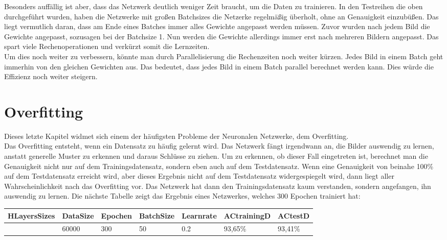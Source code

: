 \documentclass[12pt]{article}
\begin{document}
Besonders auffällig ist aber, dass das Netzwerk deutlich weniger Zeit braucht, um die Daten zu trainieren. In den Testreihen die oben durchgeführt wurden, haben die Netzwerke mit großen Batchsizes die Netzerke regelmäßig überholt, ohne an Genauigkeit einzubüßen.
Das liegt vermutlich daran, dass am Ende eines Batches immer alles Gewichte angepasst werden müssen. Zuvor wurden nach jedem Bild die Gewichte angepasst, sozusagen bei der Batchsize 1. Nun werden die Gewichte allerdings immer erst nach mehreren Bildern angepasst. Das spart viele Rechenoperationen und verkürzt somit die Lernzeiten. \\
Um dies noch weiter zu verbessern, könnte man durch Parallelisierung die Rechenzeiten noch weiter kürzen. Jedes Bild in einem Batch geht immerhin von den gleichen Gewichten aus. Das bedeutet, dass jedes Bild in einem Batch parallel berechnet werden kann. Dies würde die Effizienz noch weiter steigern.

\section{Overfitting}
Dieses letzte Kapitel widmet sich einem der häufigsten Probleme der Neuronalen Netzwerke, dem Overfitting. \\
Das Overfitting entsteht, wenn ein Datensatz zu häufig gelernt wird. Das Netzwerk fängt irgendwann an, die Bilder auswendig zu lernen, anstatt generelle Muster zu erkennen und daraus Schlüsse zu ziehen. 
Um zu erkennen, ob dieser Fall eingetreten ist, berechnet man die Genauigkeit nicht nur auf dem Trainingsdatensatz, sondern eben auch auf dem Testdatensatz. Wenn eine Genauigkeit von beinahe 100\% auf dem Testdatensatz erreicht wird, aber dieses Ergebnis nicht auf dem Testdatensatz widergespiegelt wird, dann liegt aller Wahrscheinlichkeit nach das Overfitting vor. Das Netzwerk hat dann den Trainingsdatensatz kaum verstanden, sondern angefangen, ihn auswendig zu lernen.
Die nächste Tabelle zeigt das Ergebnis eines Netzwerkes, welches 300 Epochen trainiert hat:

\begin{table}[H]
    \centering
    \begin{tabular}{|l|l|l|l|l|l|l|}
    \hline
        HLayersSizes & DataSize & Epochen & BatchSize & Learnrate & ACtrainingD & ACtestD \\ \hline
        [784, 80, 10] & 60000 & 300 & 50 & 0.2 & 93,65\% & 93,41\% \\ \hline
    \end{tabular}
\end{table}
\end{document}

